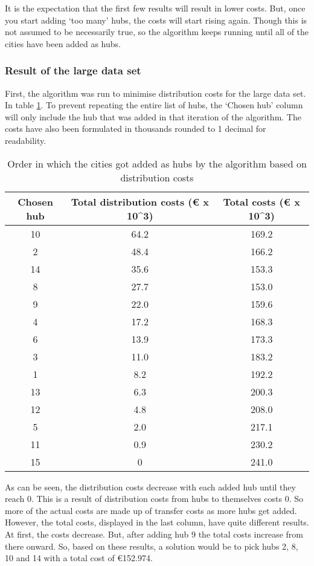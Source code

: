 \documentclass{article}
\begin{document}
It is the expectation that the first few results will result in lower costs. But, once you start adding `too many' hubs, the costs will start rising again. Though this is not assumed to be necessarily true, so the algorithm keeps running until all of the cities have been added as hubs. 

\subsubsection{Result of the large data set}
First, the algorithm was run to minimise distribution costs for the large data set. In table \ref{DistAlg}. To prevent repeating the entire list of hubs, the `Chosen hub' column will only include the hub that was added in that iteration of the algorithm. The costs have also been formulated in thousands rounded to 1 decimal for readability.

\begin{table}[h]
\centering
\begin{tabular}{||c|c|c||}
\hline
    Chosen hub & Total distribution costs (€ x 10^3)& Total costs (€ x 10^3)  \\
\hline
\hline
    10 & 64.2 & 169.2 \\
    \hline
    2 & 48.4 & 166.2 \\
    \hline
    14 & 35.6 & 153.3 \\
    \hline
    8 & 27.7 & 153.0 \\
    \hline
    9 & 22.0 & 159.6 \\
    \hline
    4 & 17.2 & 168.3 \\
    \hline
    6 & 13.9 & 173.3 \\
    \hline
    3 & 11.0 & 183.2 \\
    \hline
    1 & 8.2 & 192.2 \\
    \hline
    13 & 6.3 & 200.3 \\
    \hline
    12 & 4.8 & 208.0 \\
    \hline
    5 & 2.0 & 217.1 \\
    \hline
    11 & 0.9 & 230.2 \\
    \hline
    15 & 0 & 241.0 \\
    \hline
\end{tabular}
\caption{\centering Order in which the cities got added as hubs by the algorithm based on distribution costs}
\label{DistAlg}
\end{table}

As can be seen, the distribution costs decrease with each added hub until they reach 0. This is a result of distribution costs from hubs to themselves costs 0. So more of the actual costs are made up of transfer costs as more hubs get added. However, the total costs, displayed in the last column, have quite different results. At first, the costs decrease. But, after adding hub 9 the total costs increase from there onward. So, based on these results, a solution would be to pick hubs 2, 8, 10 and 14 with a total cost of €152.974.
\end{document}
